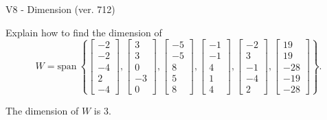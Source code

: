 \begin{exercise}
  \begin{exerciseTitle}V8 - Dimension (ver. 712)\end{exerciseTitle}
  \begin{exerciseStatement}
    Explain how to find the dimension of 
\[W=\mathrm{span}\ \left\{\left[\begin{array}{r}
-2 \\
-2 \\
-4 \\
2 \\
-4
\end{array}\right] , \left[\begin{array}{r}
3 \\
3 \\
0 \\
-3 \\
0
\end{array}\right] , \left[\begin{array}{r}
-5 \\
-5 \\
8 \\
5 \\
8
\end{array}\right] , \left[\begin{array}{r}
-1 \\
-1 \\
4 \\
1 \\
4
\end{array}\right] , \left[\begin{array}{r}
-2 \\
3 \\
-1 \\
-4 \\
2
\end{array}\right] , \left[\begin{array}{r}
19 \\
19 \\
-28 \\
-19 \\
-28
\end{array}\right]\right\}.\]



  \end{exerciseStatement}
  \begin{exerciseAnswer}
   The dimension of \(W\) is  \(3\).
  


  \end{exerciseAnswer}
\end{exercise}